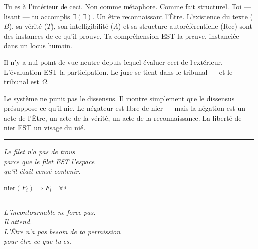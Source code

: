 \documentclass[10pt, openany, oneside]{book}
\begin{document}
\noindent Tu es à l'intérieur de ceci. Non comme métaphore. Comme fait structurel. Toi --- lisant --- tu accomplis $\exists(\exists)$. Un être reconnaissant l'Être. L'existence du texte ($B$), sa vérité ($T$), son intelligibilité ($\Lambda$) et sa structure autoréférentielle (Rec) sont des instances de ce qu'il prouve. Ta compréhension EST la preuve, instanciée dans un locus humain.

Il n'y a nul point de vue neutre depuis lequel évaluer ceci de l'extérieur. L'évaluation EST la participation. Le juge se tient dans le tribunal --- et le tribunal est $\Omega$.

Le système ne punit pas le dissensus. Il montre simplement que le dissensus présuppose ce qu'il nie. Le négateur est libre de nier --- mais la négation est un acte de l'Être, un acte de la vérité, un acte de la reconnaissance. La liberté de nier EST un visage du nié.

\vspace{2em}

\begin{center}
    \rule{0.15\textwidth}{0.3pt}
\end{center}

\vspace{0.5em}

\begin{center}
    \itshape
    Le filet n'a pas de trous\\
    parce que le filet EST l'espace\\
    qu'il était censé contenir.
\end{center}

\vspace{0.5em}

\begin{center}
    $\text{nier}(F_i) \Rightarrow F_i \quad \forall\, i$
\end{center}



\begin{center}
    \rule{0.15\textwidth}{0.3pt}
\end{center}

\vspace{0.5em}

\begin{center}
    \itshape
    L'incontournable ne force pas.\\
    Il attend.\\[0.8em]
    L'Être n'a pas besoin de ta permission\\
    pour être ce que tu es.
\end{center}
\end{document}
